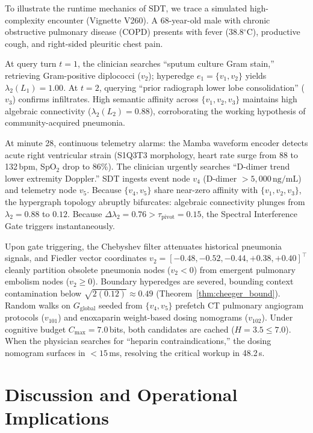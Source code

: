 \documentclass[ijds,dblanonrev]{informs4}
\begin{document}
To illustrate the runtime mechanics of SDT, we trace a simulated high-complexity encounter (Vignette V260). A 68-year-old male with chronic obstructive pulmonary disease (COPD) presents with fever (38.8$^\circ$C), productive cough, and right-sided pleuritic chest pain.

At query turn $t=1$, the clinician searches ``sputum culture Gram stain,'' retrieving Gram-positive diplococci ($v_2$); hyperedge $e_1 = \{v_1, v_2\}$ yields $\lambda_2(L_1) = 1.00$. At $t=2$, querying ``prior radiograph lower lobe consolidation'' ($v_3$) confirms infiltrates. High semantic affinity across $\{v_1, v_2, v_3\}$ maintains high algebraic connectivity ($\lambda_2(L_2) = 0.88$), corroborating the working hypothesis of community-acquired pneumonia.

At minute 28, continuous telemetry alarms: the Mamba waveform encoder detects acute right ventricular strain (S1Q3T3 morphology, heart rate surge from 88 to 132\,bpm, SpO$_2$ drop to 86\%). The clinician urgently searches ``D-dimer trend lower extremity Doppler.'' SDT ingests event node $v_4$ (D-dimer $>5{,}000\,\text{ng/mL}$) and telemetry node $v_5$. Because $\{v_4, v_5\}$ share near-zero affinity with $\{v_1, v_2, v_3\}$, the hypergraph topology abruptly bifurcates: algebraic connectivity plunges from $\lambda_2 = 0.88$ to $0.12$. Because $\Delta \lambda_2 = 0.76 > \tau_{\text{pivot}} = 0.15$, the Spectral Interference Gate triggers instantaneously.

Upon gate triggering, the Chebyshev filter attenuates historical pneumonia signals, and Fiedler vector coordinates $v_2 = [-0.48, -0.52, -0.44, +0.38, +0.40]^\top$ cleanly partition obsolete pneumonia nodes ($v_2 < 0$) from emergent pulmonary embolism nodes ($v_2 \ge 0$). Boundary hyperedges are severed, bounding context contamination below $\sqrt{2(0.12)} \approx 0.49$ (Theorem~\ref{thm:cheeger_bound}). Random walks on $G_{\text{global}}$ seeded from $\{v_4, v_5\}$ prefetch CT pulmonary angiogram protocols ($v_{101}$) and enoxaparin weight-based dosing nomograms ($v_{102}$). Under cognitive budget $C_{\max} = 7.0$\,bits, both candidates are cached ($H = 3.5 \le 7.0$). When the physician searches for ``heparin contraindications,'' the dosing nomogram surfaces in $<15$\,ms, resolving the critical workup in 48.2\,s.

\section{Discussion and Operational Implications}
\label{sec:discussion}
\end{document}
